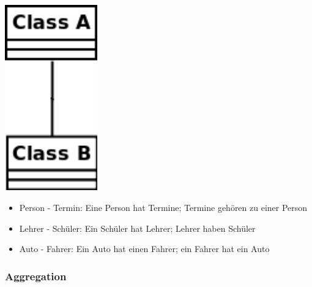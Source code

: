 \documentclass[11pt, a4paper]{article}
\begin{document}
\begin{minipage}[h]{0.3\textwidth}
    \raggedleft \includegraphics[width=0.3\textwidth]{Klassen-Elemente/2.png} 
\end{minipage}
\begin{minipage}[h]{0.65\textwidth}
    \begin{itemize}
        \item Person - Termin: Eine Person hat Termine; Termine gehören zu einer Person
        \item Lehrer - Schüler: Ein Schüler hat Lehrer; Lehrer haben Schüler
        \item Auto - Fahrer: Ein Auto hat einen Fahrer; ein Fahrer hat ein Auto
    \end{itemize}
\end{minipage}

\vspace{1em}

\raggedright \subsubsection{Aggregation}

\vspace{1em}
\end{document}
